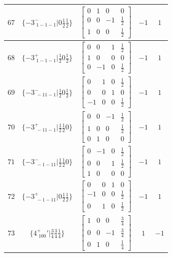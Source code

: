 \documentclass[fleqn,8pt]{jsarticle}
\begin{document}
\begin{longtable}{ccccc}
$ 67 $ & $ \{-3^{-}_{\,\,1-1-1}|0 \frac{1}{2} \frac{1}{2}\} $ & $ \begin{bmatrix} 0 & 1 & 0 & 0 \\ 0 & 0 & -1 & \frac{1}{2} \\ 1 & 0 & 0 & \frac{1}{2} \end{bmatrix} $ & $ -1 $ & $ 1 $ \\ \hline
$ 68 $ & $ \{-3^{+}_{\,\,1-1-1}|\frac{1}{2} 0 \frac{1}{2}\} $ & $ \begin{bmatrix} 0 & 0 & 1 & \frac{1}{2} \\ 1 & 0 & 0 & 0 \\ 0 & -1 & 0 & \frac{1}{2} \end{bmatrix} $ & $ -1 $ & $ 1 $ \\ \hline
$ 69 $ & $ \{-3^{-}_{\,\,-11-1}|\frac{1}{2} 0 \frac{1}{2}\} $ & $ \begin{bmatrix} 0 & 1 & 0 & \frac{1}{2} \\ 0 & 0 & 1 & 0 \\ -1 & 0 & 0 & \frac{1}{2} \end{bmatrix} $ & $ -1 $ & $ 1 $ \\ \hline
$ 70 $ & $ \{-3^{+}_{\,\,-11-1}|\frac{1}{2} \frac{1}{2} 0\} $ & $ \begin{bmatrix} 0 & 0 & -1 & \frac{1}{2} \\ 1 & 0 & 0 & \frac{1}{2} \\ 0 & 1 & 0 & 0 \end{bmatrix} $ & $ -1 $ & $ 1 $ \\ \hline
$ 71 $ & $ \{-3^{-}_{\,\,-1-11}|\frac{1}{2} \frac{1}{2} 0\} $ & $ \begin{bmatrix} 0 & -1 & 0 & \frac{1}{2} \\ 0 & 0 & 1 & \frac{1}{2} \\ 1 & 0 & 0 & 0 \end{bmatrix} $ & $ -1 $ & $ 1 $ \\ \hline
$ 72 $ & $ \{-3^{+}_{\,\,-1-11}|0 \frac{1}{2} \frac{1}{2}\} $ & $ \begin{bmatrix} 0 & 0 & 1 & 0 \\ -1 & 0 & 0 & \frac{1}{2} \\ 0 & 1 & 0 & \frac{1}{2} \end{bmatrix} $ & $ -1 $ & $ 1 $ \\ \hline
$ 73 $ & $ \{4^{+}_{\,\,100}{}'|\frac{3}{4} \frac{3}{4} \frac{1}{4}\} $ & $ \begin{bmatrix} 1 & 0 & 0 & \frac{3}{4} \\ 0 & 0 & -1 & \frac{3}{4} \\ 0 & 1 & 0 & \frac{1}{4} \end{bmatrix} $ & $ 1 $ & $ -1 $ \\ \hline

\end{longtable}
\end{document}
